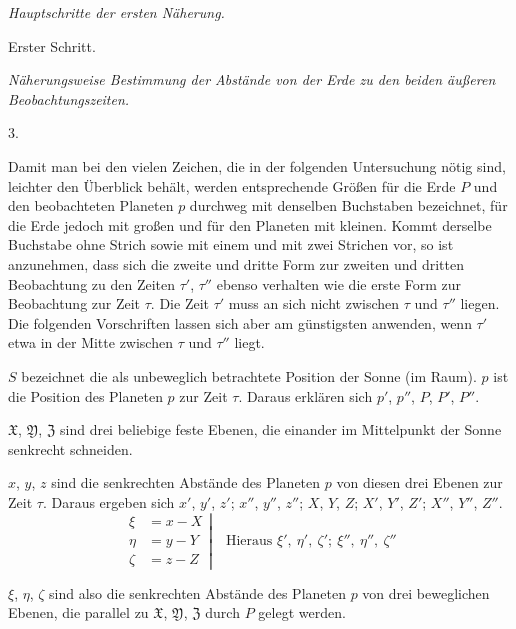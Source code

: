 \begin{center}
\emph{Hauptschritte der ersten Näherung.}\par\medskip
Erster Schritt.\par\smallskip
\emph{Näherungsweise Bestimmung der Abstände von der Erde zu den beiden äußeren Beobachtungszeiten.}
\end{center}
\begin{center}3.\end{center}
Damit man bei den vielen Zeichen, die in der folgenden Untersuchung nötig sind, leichter den Überblick behält, werden entsprechende Größen für die Erde $P$ und den beobachteten Planeten $p$ durchweg mit denselben Buchstaben bezeichnet, für die Erde jedoch mit großen und für den Planeten mit kleinen. Kommt derselbe Buchstabe ohne Strich sowie mit einem und mit zwei Strichen vor, so ist anzunehmen, dass sich die zweite und dritte Form zur zweiten und dritten Beobachtung zu den Zeiten $\tau'$, $\tau''$ ebenso verhalten wie die erste Form zur Beobachtung zur Zeit $\tau$. Die Zeit $\tau'$ muss an sich nicht zwischen $\tau$ und $\tau''$ liegen. Die folgenden Vorschriften lassen sich aber am günstigsten anwenden, wenn $\tau'$ etwa in der Mitte zwischen $\tau$ und $\tau''$ liegt.

$S$ bezeichnet die als unbeweglich betrachtete Position der Sonne (im Raum). $p$ ist die Position des Planeten $p$ zur Zeit $\tau$. Daraus erklären sich $p'$, $p''$, $P$, $P'$, $P''$.

$\mathfrak{X}$, $\mathfrak{Y}$, $\mathfrak{Z}$ sind drei beliebige feste Ebenen, die einander im Mittelpunkt der Sonne senkrecht schneiden.

$x$, $y$, $z$ sind die senkrechten Abstände des Planeten $p$ von diesen drei Ebenen zur Zeit $\tau$. Daraus ergeben sich $x'$, $y'$, $z'$; $x''$, $y''$, $z''$; $X$, $Y$, $Z$; $X'$, $Y'$, $Z'$; $X''$, $Y''$, $Z''$.
\[
\left.\begin{aligned}
\xi&=x-X\\
\eta&=y-Y\\
\zeta&=z-Z
\end{aligned}\right|\quad\text{Hieraus }\xi',\ \eta',\ \zeta';\ \xi'',\ \eta'',\ \zeta''
\]

$\xi$, $\eta$, $\zeta$ sind also die senkrechten Abstände des Planeten $p$ von drei beweglichen Ebenen, die parallel zu $\mathfrak{X}$, $\mathfrak{Y}$, $\mathfrak{Z}$ durch $P$ gelegt werden.

